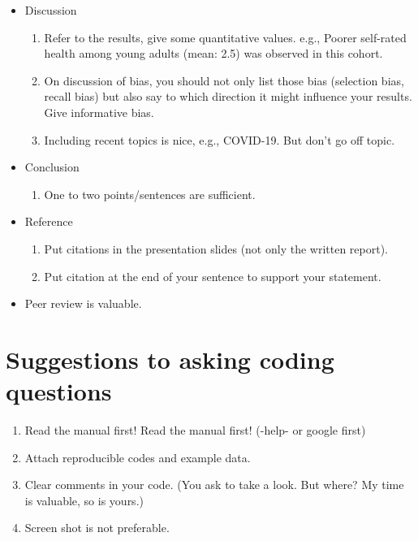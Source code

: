 \documentclass{beamer}
\begin{document}
\begin{frame}{\secname}
\begin{itemize}
	\item Discussion
	\begin{enumerate}
		\item Refer to the results, give some quantitative values. e.g., Poorer self-rated health among young adults (mean: 2.5) was observed in this cohort.
		\item On discussion of bias, you should not only list those bias (selection bias, recall bias) but also say to which direction it might influence your results. Give informative bias.
		\item Including recent topics is nice, e.g., COVID-19. But don't go off topic. 
	\end{enumerate}
	\item Conclusion
	\begin{enumerate}
		\item One to two points/sentences are sufficient.	
	\end{enumerate}
	
	\item Reference
	\begin{enumerate}
		\item Put citations in the presentation 	slides (not only the written report).
		\item Put citation at the end of your sentence to support your statement.
	\end{enumerate}

	\item Peer review is valuable.
\end{itemize}
\end{frame}

\section{Suggestions to asking coding questions}
\begin{frame}{\secname}
\begin{enumerate}
	\item Read the manual first! Read the manual first! (-help- or google first)
	\item Attach reproducible codes and example data.
	\item Clear comments in your code. (You ask to take a look. But where? My time is valuable, so is yours.)
	\item Screen shot is not preferable. 
\end{enumerate}
\end{frame}
\end{document}
